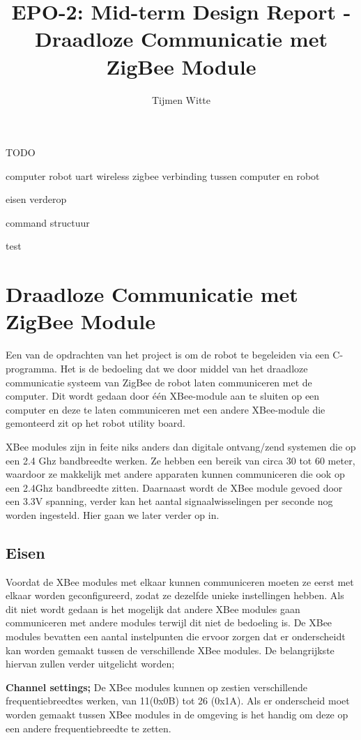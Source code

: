\documentclass{report}
\title{EPO-2: Mid-term Design Report - Draadloze Communicatie met ZigBee Module}
\author{Tijmen Witte}
\begin{document}
TODO

computer robot uart wireless zigbee
verbinding tussen computer en robot

eisen verderop

command structuur 

test



\chapter{Draadloze Communicatie met ZigBee Module}

Een van de opdrachten van het project is om de robot te begeleiden via een C-programma. Het is de bedoeling dat we door middel van het draadloze communicatie systeem van ZigBee de robot laten communiceren met de computer. Dit wordt gedaan door één XBee-module aan te sluiten op een computer en deze te laten communiceren met een andere XBee-module die  gemonteerd zit op het robot utility board.
\newline

\noindent XBee modules zijn in feite niks anders dan digitale ontvang/zend systemen die op een 2.4 Ghz bandbreedte werken. Ze hebben een bereik van circa 30 tot 60 meter, waardoor ze makkelijk met andere apparaten kunnen communiceren die ook op een 2.4Ghz bandbreedte zitten. Daarnaast wordt de XBee module gevoed door een 3.3V spanning, verder kan het aantal signaalwisselingen per seconde nog worden ingesteld. Hier gaan we later  verder op in.
\newline



\section{Eisen}

Voordat de XBee modules met elkaar kunnen communiceren moeten ze eerst met elkaar worden geconfigureerd, zodat ze dezelfde unieke instellingen hebben. Als dit niet wordt gedaan is het mogelijk dat andere XBee modules gaan communiceren met andere modules terwijl dit niet de bedoeling is.
\newline
De XBee modules bevatten een aantal instelpunten die ervoor zorgen dat er onderscheidt kan worden gemaakt tussen de verschillende XBee modules. De belangrijkste hiervan zullen verder uitgelicht worden;
\newline

\textbf{Channel settings;}
\newline
De XBee modules kunnen op zestien verschillende frequentiebreedtes werken, van 11(0x0B) tot 26 (0x1A). Als er onderscheid moet worden gemaakt tussen XBee modules in de omgeving is het handig om deze op een andere frequentiebreedte te zetten.
\newline
\end{document}
